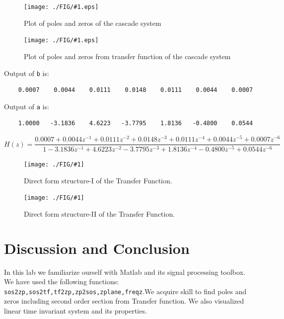 \documentclass[a4paper,11pt]{article}
\newcommand{\mobs}[2]{
    \begin{figure}[H]
        \centering
        \texttt{[image: ./FIG/\#1.eps]}
        \caption{#2}
    \end{figure}
   
}
\newcommand{\fig}[2]{
    \begin{figure}[H]
        \centering
        \texttt{[image: ./FIG/\#1]}
        \caption{#2}
    \end{figure}
}
\begin{document}
\mobs{p3a}{Plot of poles and zeros of the cascade system }
\mobs{p3b}{Plot of poles and zeros from transfer function of the cascade system }

Output of \texttt{b} is:
\begin{verbatim} 
    0.0007    0.0044    0.0111    0.0148    0.0111    0.0044    0.0007
\end{verbatim}

Output of \texttt{a} is:
\begin{verbatim} 
    1.0000   -3.1836    4.6223   -3.7795    1.8136   -0.4800    0.0544
\end{verbatim}

\begin{equation*}
    H(z)=\frac{0.0007+0.0044z^{-1}+0.0111z^{-2}+0.0148z^{-3}+0.0111z^{-4}+0.0044z^{-5}+0.0007z^{-6}}{1-3.1836z^{-1}+4.6223z^{-2}-3.7795z^{-3}+1.8136z^{-4}-0.4800z^{-5}+0.0544z^{-6}}
\end{equation*}

\fig{d_I.png}{Direct form structure-I of the Transfer Function.}
\fig{d_II.png}{Direct form structure-II of the Transfer Function.}

\section{Discussion and Conclusion}
In this lab we familiarize ourself with Matlab and its signal processing toolbox. We have used the following functions: \texttt{sos2zp,sos2tf,tf2zp,zp2sos,zplane,freqz}.We acquire skill to find poles and zeros including second order section from Transfer function.  We also visualized linear time invariant system and its properties.
\end{document}
